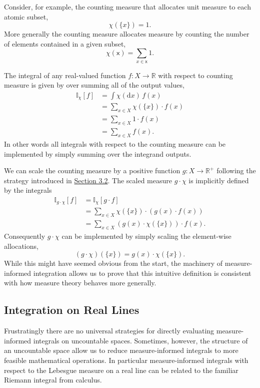 \documentclass[
  letterpaper,
  DIV=11,
  numbers=noendperiod]{scrartcl}
\begin{document}
Consider, for example, the counting measure that allocates unit measure
to each atomic subset, \[
\chi( \{x \}) = 1.
\] More generally the counting measure allocates measure by counting the
number of elements contained in a given subset, \[
\chi( \mathsf{x} ) = \sum_{x \in \mathsf{x}} 1.
\]

The integral of any real-valued function \(f: X \rightarrow \mathbb{R}\)
with respect to counting measure is given by over summing all of the
output values, \begin{align*}
\mathbb{I}_{\chi}[f]
&=
\int \chi( \mathrm{d} x) \, f(x)
\\
&=
\sum_{x \in X} \chi(\{ x \}) \cdot f(x)
\\
&=
\sum_{x \in X} 1 \cdot f(x)
\\
&=
\sum_{x \in X} f(x).
\end{align*} In other words all integrals with respect to the counting
measure can be implemented by simply summing over the integrand outputs.

We can scale the counting measure by a positive function
\(g : X \rightarrow \mathbb{R}^{+}\) following the strategy introduced
in \href{@sec:scaling_measures}{Section 3.2}. The scaled measure
\(g \cdot \chi\) is implicitly defined by the integrals \begin{align*}
\mathbb{I}_{g \cdot \chi}[f]
&=
\mathbb{I}_{\chi}[g \cdot f]
\\
&=
\sum_{x \in X} \chi( \{ x \}) \cdot \left( g(x) \cdot f(x) \right)
\\
&=
\sum_{x \in X} \left( g(x) \cdot \chi( \{ x \} ) \right) \cdot f(x).
\end{align*} Consequently \(g \cdot \chi\) can be implemented by simply
scaling the element-wise allocations, \[
(g \cdot \chi)( \{ x \} ) = g(x) \cdot \chi( \{ x \} ).
\] While this might have seemed obvious from the start, the machinery of
measure-informed integration allows us to prove that this intuitive
definition is consistent with how measure theory behaves more generally.

\hypertarget{sec:integration_on_R}{%
\subsection{Integration on Real Lines}\label{sec:integration_on_R}}

Frustratingly there are no universal strategies for directly evaluating
measure-informed integrals on uncountable spaces. Sometimes, however,
the structure of an uncountable space allow us to reduce
measure-informed integrals to more feasible mathematical operations. In
particular measure-informed integrals with respect to the Lebesgue
measure on a real line can be related to the familiar Riemann integral
from calculus.
\end{document}

